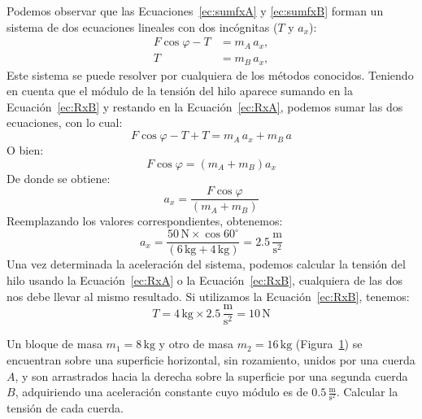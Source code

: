 \documentclass[addpoints]{exam}
\newcommand{\grado}[0]{^{\circ}}
\begin{document}
\begin{questions}
\begin{solution}
        Podemos observar que las Ecuaciones~\eqref{ec:sumfxA} y \eqref{ec:sumfxB} forman un sistema de dos ecuaciones lineales con dos incógnitas ($T$ y $a_x$):
        \begin{align}
            F \cos \varphi - T &= m_A \, a_x, \label{ec:RxA} \\
                            T &= m_B \, a_x, \label{ec:RxB}
        \end{align} Este sistema se puede resolver por cualquiera de los métodos conocidos. Teniendo en cuenta que el módulo de la tensión del hilo aparece sumando en la Ecuación~\eqref{ec:RxB} y restando en la Ecuación~\eqref{ec:RxA}, podemos sumar las dos ecuaciones, con lo cual: $$ F \cos \varphi - T + T = m_A \, a_x + m_B \, a$$ O bien: $$ F \cos \varphi = \left(m_A + m_B\right) a_x$$ De donde se obtiene: $$a_x = \frac{F \cos \varphi}{\left(m_A + m_B\right)}$$ Reemplazando los valores correspondientes, obtenemos: $$ a_x = \frac{50 \, \text{N} \times \cos 60\grado}{\left(6 \, \text{kg} + 4 \, \text{kg}\right)} = 2.5 \, \frac{\text{m}}{\text{s}^2}$$ Una vez determinada la aceleración del sistema, podemos calcular la tensión del hilo usando la Ecuación~\eqref{ec:RxA} o la Ecuación~\eqref{ec:RxB}, cualquiera de las dos nos debe llevar al mismo resultado. Si utilizamos la Ecuación~\eqref{ec:RxB}, tenemos: $$T = 4 \, \text{kg} \times 2.5 \, \frac{\text{m}}{\text{s}^2} = 10 \, \text{N}$$

    \end{solution}

    \question Un bloque de masa $m_1 = 8 \, \text{kg}$ y otro de masa $m_2 = 16 \, \text{kg}$ (Figura~\ref{fig:vinculados1}) se encuentran sobre una superficie horizontal, sin rozamiento, unidos por una cuerda $A$, y son arrastrados hacia la derecha sobre la superficie por una segunda cuerda $B$, adquiriendo una aceleración constante cuyo módulo es de $0.5 \, \frac{\text{m}}{\text{s}^2}$. Calcular la tensión de cada cuerda. \label{ej:vinculados2}

    \begin{figure}[h]
        \centering
        \caption{ }
        \label{fig:vinculados1}
    \end{figure}


\end{questions}
\end{document}
